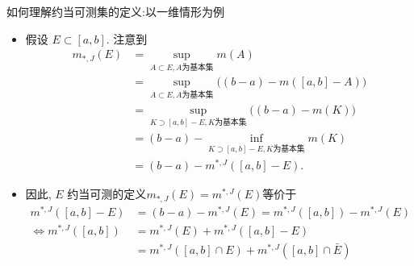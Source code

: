\documentclass[Prob-All.tex]{subfiles}
\begin{document}
\begin{frame}{如何理解约当可测集的定义:以一维情形为例}



	\begin{itemize}[<+-|alert@+>]
		\item 假设 $E\subset [a,b]$. 注意到
\begin{align*}
  m_{*,J}(E)&=\sup_{A\subset E, A\mbox{为基本集}}m(A)\\
  &=\sup_{A\subset E, A\mbox{为基本集}}\big((b-a)-m([a,b]-A)\big)\\
            &=\sup_{K\supset [a,b]-E, K\mbox{为基本集}}\big((b-a)-m(K)\big)\\
			&=(b-a)-\inf_{K\supset [a,b]-E, K\mbox{为基本集}}m(K)\\
			&=(b-a)-m^{*,J}([a,b]-E).
\end{align*}
	\item 因此, $E$ 约当可测的定义$m_{*,J}(E)=m^{*,J}(E)$等价于
	{\small \begin{align*}
		m^{*,J}([a,b]-E)&=(b-a)-m^{*,J}(E)=m^{*,J}([a,b])-m^{*,J}(E)\\
	\iff m^{*,J}([a,b])&=m^{*,J}(E)+m^{*,J}([a,b]-E)\\
	&=m^{*,J}([a,b]\cap E)+m^{*,J}([a,b]\cap \bar{E})
	\end{align*}}
	\end{itemize}

\end{frame}
\end{document}
